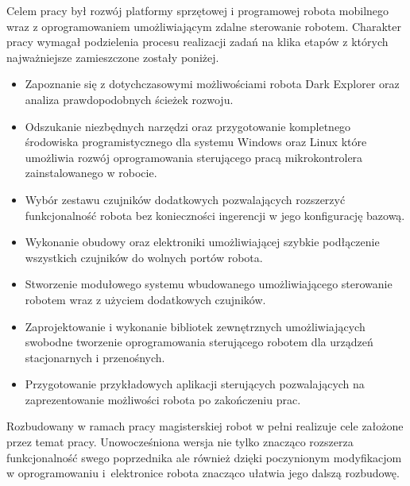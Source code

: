Celem pracy był rozwój platformy sprzętowej i programowej robota mobilnego wraz z
oprogramowaniem umożliwiającym zdalne sterowanie robotem. Charakter pracy wymagał
podzielenia procesu realizacji zadań na klika etapów z których najważniejsze
zamieszczone zostały poniżej.

\begin{itemize}
  \item Zapoznanie się z dotychczasowymi możliwościami robota Dark Explorer oraz
  analiza prawdopodobnych ścieżek rozwoju.
  \item Odszukanie niezbędnych narzędzi oraz przygotowanie kompletnego
  środowiska programistycznego dla systemu Windows oraz Linux
  które umożliwia rozwój oprogramowania sterującego pracą mikrokontrolera
  zainstalowanego w robocie.
  \item Wybór zestawu czujników dodatkowych pozwalających rozszerzyć 
  funkcjonalność robota bez konieczności ingerencji w jego konfigurację bazową.
  \item Wykonanie obudowy oraz elektroniki umożliwiającej szybkie podłączenie
  wszystkich czujników do wolnych portów robota. 
  \item Stworzenie modułowego systemu wbudowanego umożliwiającego sterowanie
  robotem wraz z użyciem dodatkowych czujników.
  \item Zaprojektowanie i wykonanie bibliotek zewnętrznych umożliwiających
  swobodne tworzenie oprogramowania sterującego robotem dla urządzeń
  stacjonarnych i przenośnych.
  \item Przygotowanie przykładowych aplikacji sterujących pozwalających na
  zaprezentowanie możliwości robota po zakończeniu prac.
\end{itemize}

Rozbudowany w ramach pracy magisterskiej robot w pełni realizuje cele założone
przez temat pracy. Unowocześniona wersja nie tylko znacząco rozszerza
funkcjonalność swego poprzednika ale również dzięki poczynionym modyfikacjom w
oprogramowaniu i~elektronice robota znacząco ułatwia jego dalszą rozbudowę.

